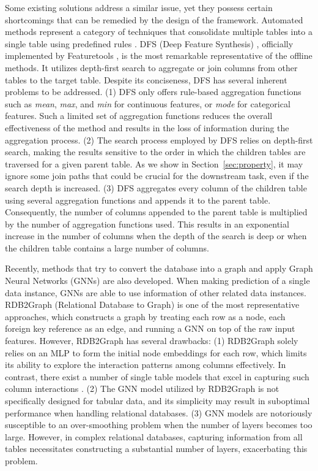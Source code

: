 Some existing solutions address a similar issue, yet they possess certain shortcomings that can be remedied by the design of the \model{} framework.
Automated methods represent a category of techniques that consolidate multiple tables into a single table using predefined rules \cite{kanter2015deep, lam2017one, arda, liu2022feature, galhotra2023metam}. DFS (Deep Feature Synthesis) \cite{kanter2015deep}, officially implemented by Featuretools \cite{featuretools}, is the most remarkable representative of the offline methods. %
It utilizes depth-first search to aggregate or join columns from other tables to the target table. %
Despite its conciseness, DFS has several inherent problems to be addressed.
(1) DFS only offers rule-based aggregation functions such as \textit{mean}, \textit{max}, and \textit{min} for continuous features, or \textit{mode} for categorical features. Such a limited set of aggregation functions reduces the overall effectiveness of the method and results in the loss of information during the aggregation process.
(2) The search process employed by DFS relies on depth-first search, making the results sensitive to the order in which the children tables are traversed for a given parent table.  As we show in Section~\ref{sec:property}, it may ignore some join paths that could be crucial for the downstream task, even if the search depth is increased.
(3) DFS aggregates every column of the children table using several aggregation functions and appends it to the parent table. Consequently, the number of columns appended to the parent table is multiplied by the number of aggregation functions used. This results in an exponential increase in the number of columns when the depth of the search is deep or when the children table contains a large number of columns.

Recently, methods that try to convert the database into a graph and apply Graph Neural Networks (GNNs) are also developed. When making prediction of a single data instance, GNNs are able to use information of other related data instances.  RDB2Graph (Relational Database to Graph) \cite{cvitkovic2020supervised} is one of the most representative approaches, which constructs a graph by %
treating each row as a node, each foreign key reference as an edge, and running a GNN on top of the raw input features.  %
However, RDB2Graph has several drawbacks:
(1) RDB2Graph solely relies on an MLP to form the initial node embeddings for each row, which limits its ability to explore the interaction patterns among columns effectively. In contrast, there exist a number of single table models that excel in capturing such column interactions \cite{rendle2010factorization,guo2017deepfm,qu2018product}.
(2) The GNN model utilized by RDB2Graph is not specifically designed for tabular data, and its simplicity may result in suboptimal performance when handling relational databases.
(3) GNN models are notoriously susceptible to an over-smoothing problem when the number of layers becomes too large. However, in complex relational databases, capturing information from all tables necessitates constructing a substantial number of layers, exacerbating this problem.

